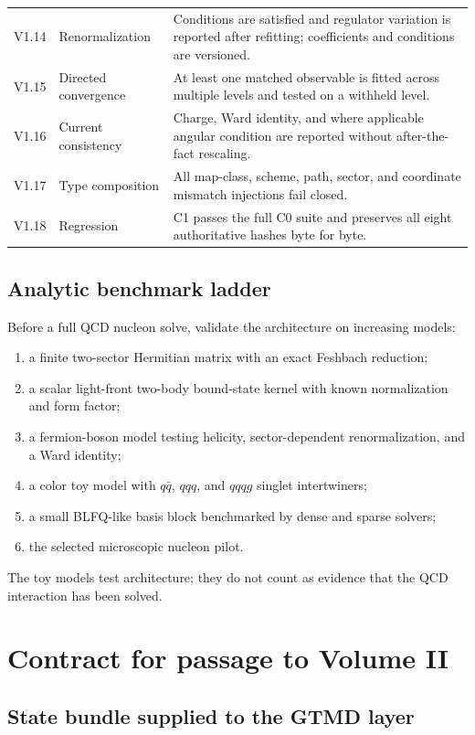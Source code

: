 \documentclass[11pt]{article}
\begin{document}
\begin{longtable}{L{0.07\textwidth}L{0.35\textwidth}L{0.48\textwidth}}
V1.14 & Renormalization & Conditions are satisfied and regulator variation is reported after refitting; coefficients and conditions are versioned.\\
V1.15 & Directed convergence & At least one matched observable is fitted across multiple levels and tested on a withheld level.\\
V1.16 & Current consistency & Charge, Ward identity, and where applicable angular condition are reported without after-the-fact rescaling.\\
V1.17 & Type composition & All map-class, scheme, path, sector, and coordinate mismatch injections fail closed.\\
V1.18 & Regression & C1 passes the full C0 suite and preserves all eight authoritative hashes byte for byte.\\
\bottomrule
\end{longtable}

\subsection{Analytic benchmark ladder}

Before a full QCD nucleon solve, validate the architecture on increasing
models:
\begin{enumerate}
\item a finite two-sector Hermitian matrix with an exact Feshbach reduction;
\item a scalar light-front two-body bound-state kernel with known
normalization and form factor;
\item a fermion-boson model testing helicity, sector-dependent
renormalization, and a Ward identity;
\item a color toy model with \(q\bar q\), \(qqq\), and \(qqqg\) singlet
intertwiners;
\item a small BLFQ-like basis block benchmarked by dense and sparse
solvers;
\item the selected microscopic nucleon pilot.
\end{enumerate}
The toy models test architecture; they do not count as evidence that the QCD
interaction has been solved.

\section{Contract for passage to Volume II}
\label{sec:volume2-contract}

\subsection{State bundle supplied to the GTMD layer}
\end{document}
